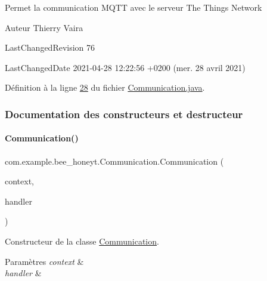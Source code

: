 Permet la communication M\+Q\+TT avec le serveur The Things Network \begin{DoxyAuthor}{Auteur}
Thierry Vaira 
\end{DoxyAuthor}
\begin{DoxyParagraph}{Last\+Changed\+Revision}
76 
\end{DoxyParagraph}
\begin{DoxyParagraph}{Last\+Changed\+Date}
2021-\/04-\/28 12\+:22\+:56 +0200 (mer. 28 avril 2021) 
\end{DoxyParagraph}


Définition à la ligne \hyperlink{_communication_8java_source_l00028}{28} du fichier \hyperlink{_communication_8java_source}{Communication.\+java}.



\subsubsection{Documentation des constructeurs et destructeur}
\mbox{\label{classcom_1_1example_1_1bee__honeyt_1_1_communication_a1f92cddc3a6b011683d0ed8d1371227d}} 
\paragraph{\texorpdfstring{Communication()}{Communication()}}
{\footnotesize\ttfamily com.\+example.\+bee\+\_\+honeyt.\+Communication.\+Communication (\begin{DoxyParamCaption}\item[{Context}]{context,  }\item[{final Handler}]{handler }\end{DoxyParamCaption})}



Constructeur de la classe \hyperlink{classcom_1_1example_1_1bee__honeyt_1_1_communication}{Communication}. 


\begin{DoxyParams}{Paramètres}
{\em context} & \\
\hline
{\em handler} & \\
\hline
\end{DoxyParams}


